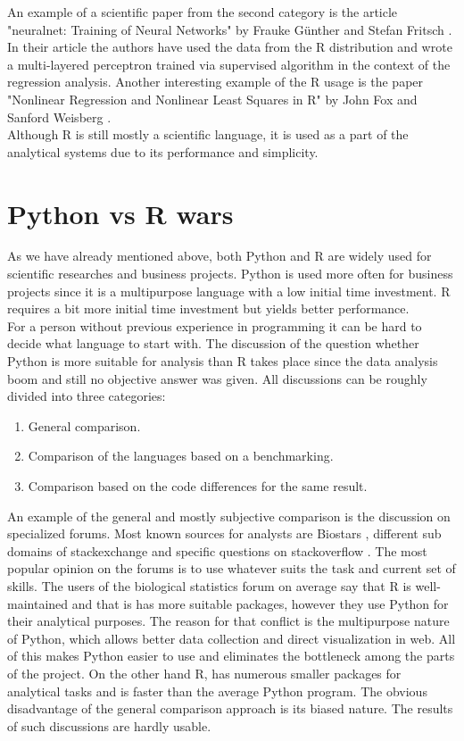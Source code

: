 \documentclass[
  twoside,
  11pt, a4paper,
  footinclude=true,
  headinclude=true,
  cleardoublepage=empty
]{scrreprt}
\begin{document}
        An example of a scientific paper from the second category is the article "neuralnet: Training of Neural Networks" by Frauke Günther and Stefan Fritsch \cite{r:Example1}. In their article the authors have used the data from the R distribution and wrote a multi-layered perceptron trained via supervised algorithm in the context of the regression analysis. Another interesting example of the R usage is the paper "Nonlinear Regression and Nonlinear Least Squares in R" by John Fox and Sanford Weisberg \cite{r:Example2}.\\
        Although R is still mostly a scientific language, it is used as a part of the analytical systems due to its performance and simplicity.
        
        \section{Python vs R wars}
        As we have already mentioned above, both Python and R are widely used for scientific researches and business projects. Python is used more often for business projects since it is a multipurpose language with a low initial time investment. R requires a bit more initial time investment but yields better performance.\\
        For a person without previous experience in programming it can be hard to decide what language to start with. The discussion of the question whether Python is more suitable for analysis than R takes place since the data analysis boom and still no objective answer was given. All discussions can be roughly divided into three categories:
        \begin{enumerate}
            \item General comparison.
            \item Comparison of the languages based on a benchmarking.
            \item Comparison based on the code differences for the same result.
        \end{enumerate}
        An example of the general and mostly subjective comparison is the discussion on specialized forums. Most known sources for analysts are Biostars \cite{forum:Biostars}, different sub domains of stackexchange \cite{forum:Stackexcahnge} and specific questions on stackoverflow \cite{forum:Stackoverflow}. The most popular opinion on the forums is to use whatever suits the task and current set of skills. The users of the biological statistics forum on average say that R is well-maintained and that is has more suitable packages, however they use Python for their analytical purposes. The reason for that conflict is the multipurpose nature of Python, which allows better data collection and direct visualization in web. All of this makes Python easier to use and eliminates the bottleneck among the parts of the project. On the other hand R, has numerous smaller packages for analytical tasks and is faster than the average Python program. The obvious disadvantage of the general comparison approach is its biased nature. The results of such discussions are hardly usable.\\
\end{document}
